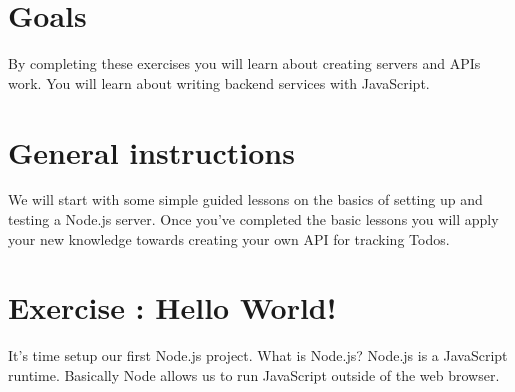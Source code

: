 \documentclass{42-en}
\begin{document}
\chapter{Goals}

        By completing these exercises you will learn about creating servers and 
    APIs work. You will learn about writing backend services with JavaScript.


\chapter{General instructions}

    We will start with some simple guided lessons on the basics of setting up 
and testing a Node.js server. Once you've completed the basic lessons you will 
apply your new knowledge towards creating your own API for tracking Todos.

\startexercices


\chapter{Exercise \exercicenumber: Hello World!}

    It’s time setup our first Node.js project. What is Node.js? Node.js is a 
JavaScript runtime. Basically Node allows us to run JavaScript outside of the 
web browser.
\end{document}
